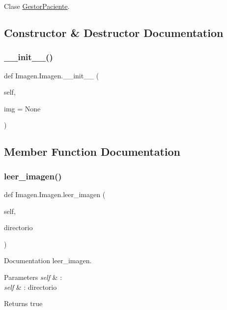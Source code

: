Clase \mbox{\hyperlink{namespace_gestor_paciente}{Gestor\+Paciente}}. 

\subsection{Constructor \& Destructor Documentation}
\mbox{\label{class_imagen_1_1_imagen_af56feb3348d81937a479c64de374d422}} 
\subsubsection{\texorpdfstring{\+\_\+\+\_\+init\+\_\+\+\_\+()}{\_\_init\_\_()}}
{\footnotesize\ttfamily def Imagen.\+Imagen.\+\_\+\+\_\+init\+\_\+\+\_\+ (\begin{DoxyParamCaption}\item[{}]{self,  }\item[{}]{img = {\ttfamily None} }\end{DoxyParamCaption})}



\subsection{Member Function Documentation}
\mbox{\label{class_imagen_1_1_imagen_a76c63b1c129f5ef3e7ea63802209e645}} 
\subsubsection{\texorpdfstring{leer\+\_\+imagen()}{leer\_imagen()}}
{\footnotesize\ttfamily def Imagen.\+Imagen.\+leer\+\_\+imagen (\begin{DoxyParamCaption}\item[{}]{self,  }\item[{}]{directorio }\end{DoxyParamCaption})}



Documentation leer\+\_\+imagen. 


\begin{DoxyParams}{Parameters}
{\em self} & \+: \\
\hline
{\em self} & \+: directorio \\
\hline
\end{DoxyParams}
\begin{DoxyReturn}{Returns}
true 
\end{DoxyReturn}
\mbox{\label{class_imagen_1_1_imagen_a4cdb42ba6cf651b032e66111f2a28219}} 
